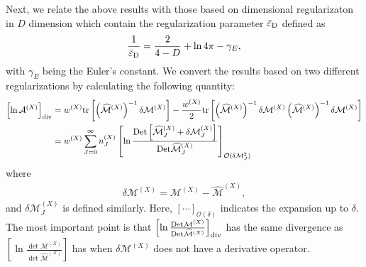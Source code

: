 \documentclass[12pt]{article}
\begin{document}
Next, we relate the above results with those based on dimensional
regularizaton in $D$ dimension which contain the regularization
parameter $\epsD$ defined as
\begin{align}
 \frac{1}{\epsD} = \frac{2}{4-D}+\ln4\pi-\gamma_E,
\end{align}
with $\gamma_E$ being the Euler's constant.  We convert the results
based on two different regularizations by calculating the following
quantity:
\begin{align}
 \left[\ln\mathcal A^{(X)}\right]_{\rm div}
  & = w^{(X)}\tr
 \left[
  \left(
   \widehat{\mathcal M}^{(X)}
  \right)^{-1}\delta\mathcal M^{(X)}
 \right]-\frac{w^{(X)}}{2}\tr
 \left[
  \left(
   \widehat{\mathcal M}^{(X)}
  \right)^{-1}\delta\mathcal M^{(X)}
  \left(
   \widehat{\mathcal M}^{(X)}
  \right)^{-1}\delta\mathcal M^{(X)}
 \right]\nonumber                         \\
  & = w^{(X)}\sum_{J=0}^{\infty}n^{(X)}_J
 \left[
  \ln\frac{\det
   \left[
    \widehat{\mathcal M}^{(X)}_J+\delta\mathcal M_J^{(X)}
   \right]}{\det \widehat{\mathcal M}^{(X)}_J}
 \right]_{\mathcal O(\delta\mathcal M_J^2)}
 \label{eq_deltaMExpansion}
\end{align}
where
\begin{align}
 \delta\mathcal M^{(X)} = \mathcal M^{(X)}-\widehat{\mathcal M}^{(X)},
\end{align}
and $\delta \mathcal M^{(X)}_J$ is defined similarly. Here,
$[\cdots]_{\mathcal O(\delta)}$ indicates the expansion up to
$\delta$. The most important point is that $\left[\ln\frac{\det\mathcal
  M^{(X)}}{\det\widehat{\mathcal M}^{(X)}}\right]_{\rm div}$ has the same
divergence as $\left[\ln\frac{\det\mathcal
  M^{(X)}}{\det\widehat{\mathcal M}^{(X)}}\right]$ has when
$\delta\mathcal M^{(X)}$ does not have a derivative operator.
\end{document}
